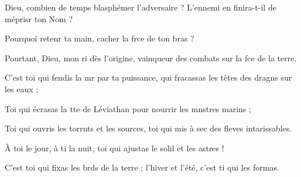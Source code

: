 \item Dieu, combien de temps blasphémer l’adversaire ?\psstar{} L’ennemi en finira-t-il de méprisr ton Nom ?
\item Pourquoi retenr ta main,\psstar{} cacher la frce de ton bras ?
\item Pourtant, Dieu, mon ri dès l’origine,\psstar{} vainqueur des combats sur la fce de la terre.
\item C’est toi qui fendis la mr par ta puissance,\psstar{} qui fracassas les têtes des dragns sur les eaux ;
\item Toi qui écrasas la tte de Léviathan\psstar{} pour nourrir les mnstres marins ;
\item Toi qui ouvris les torrnts et les sources,\psstar{} toi qui mis à sec des fleves intarissables.
\item À toi le jour, à ti la nuit,\psstar{} toi qui ajustas le solil et les astres !
\item C’est toi qui fixas les brds de la terre ;\psstar{} l’hiver et l’été, c’est ti qui les formas.